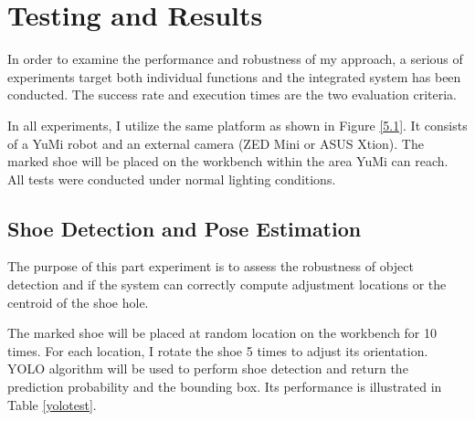 \chapter{Testing and Results}

In order to examine the performance and robustness of my approach, a serious of experiments target both individual functions and the integrated system has been conducted. The success rate and execution times are the two evaluation criteria.

In all experiments, I utilize the same platform as shown in Figure \ref{5.1}. It consists of a YuMi robot and an external camera (ZED Mini or ASUS Xtion). The marked shoe will be placed on the workbench within the area YuMi can reach. All tests were conducted under normal lighting conditions. 

\section{Shoe Detection and Pose Estimation}
The purpose of this part experiment is to assess the robustness of object detection and if the system can correctly compute adjustment locations or the centroid of the shoe hole.

The marked shoe will be placed at random location on the workbench for 10 times. For each location, I rotate the shoe 5 times to adjust its orientation. YOLO algorithm will be used to perform shoe detection and return the prediction probability and the bounding box. Its performance is illustrated in Table \ref{yolotest}.

\begin{table}[H]
\centering
{}
\caption{}
\label{yolotest}
\end{table}

